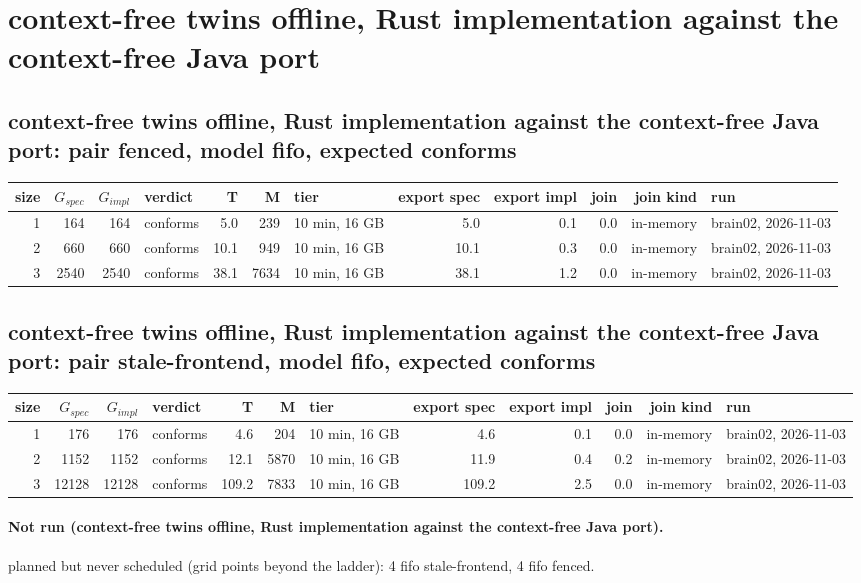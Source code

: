 \documentclass[10pt]{article}
\begin{document}
\section*{context-free twins offline, Rust implementation against the context-free Java port}
\subsection*{context-free twins offline, Rust implementation against the context-free Java port: pair \textsf{fenced}, model fifo, expected conforms}
\begin{longtable}{@{}rrrlrrlrrrrl@{}}
\toprule
size & $G_{\mathit{spec}}$ & $G_{\mathit{impl}}$ & verdict & T & M & tier & export spec & export impl & join & join kind & run \\
\midrule
\endhead
\color{red} 1 & 164 & 164 & conforms & 5.0 & 239 & 10 min, 16 GB & 5.0 & 0.1 & 0.0 & in-memory & brain02, 2026-11-03 \\
\color{red} 2 & 660 & 660 & conforms & 10.1 & 949 & 10 min, 16 GB & 10.1 & 0.3 & 0.0 & in-memory & brain02, 2026-11-03 \\
\color{red} 3 & 2540 & 2540 & conforms & 38.1 & 7634 & 10 min, 16 GB & 38.1 & 1.2 & 0.0 & in-memory & brain02, 2026-11-03 \\
\bottomrule
\end{longtable}
\subsection*{context-free twins offline, Rust implementation against the context-free Java port: pair \textsf{stale-frontend}, model fifo, expected conforms}
\begin{longtable}{@{}rrrlrrlrrrrl@{}}
\toprule
size & $G_{\mathit{spec}}$ & $G_{\mathit{impl}}$ & verdict & T & M & tier & export spec & export impl & join & join kind & run \\
\midrule
\endhead
\color{red} 1 & 176 & 176 & conforms & 4.6 & 204 & 10 min, 16 GB & 4.6 & 0.1 & 0.0 & in-memory & brain02, 2026-11-03 \\
\color{red} 2 & 1152 & 1152 & conforms & 12.1 & 5870 & 10 min, 16 GB & 11.9 & 0.4 & 0.2 & in-memory & brain02, 2026-11-03 \\
\color{red} 3 & 12128 & 12128 & conforms & 109.2 & 7833 & 10 min, 16 GB & 109.2 & 2.5 & 0.0 & in-memory & brain02, 2026-11-03 \\
\bottomrule
\end{longtable}
\paragraph{Not run (context-free twins offline, Rust implementation against the context-free Java port).}
planned but never scheduled (grid points beyond the ladder): 4 fifo stale-frontend, 4 fifo fenced.\par
\end{document}
